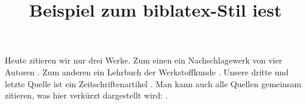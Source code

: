 \documentclass[12pt,a4paper]{scrartcl}
\title{Beispiel zum biblatex-Stil \glqq iest\grqq}
\begin{document}
Heute zitieren wir nur drei Werke. Zum einen ein Nachschlagewerk von vier Autoren \autocite{Binomi2004}. Zum anderen ein Lehrbuch der Werkstoffkunde \autocite{Bargel2012}. Unsere dritte und letzte Quelle ist ein Zeitschriftenartikel \autocite{Detert1963}. Man kann auch alle Quellen gemeinsam zitieren, was hier verkürzt dargestellt wird: \autocite{Bargel2012,Binomi2004,Detert1963}.

\printbibliography
\end{document}
